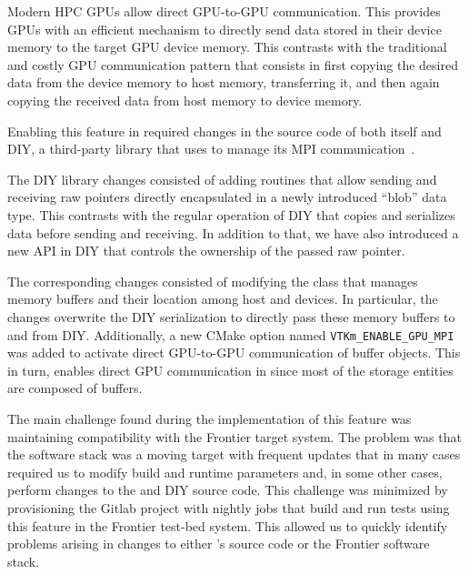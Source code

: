Modern HPC GPUs allow direct GPU-to-GPU communication. This provides GPUs with an efficient mechanism to directly send data stored in their device memory to the target GPU device memory. This contrasts with the traditional and costly GPU communication pattern that consists in first copying the desired data from the device memory to host memory, transferring it, and then again copying the received data from host memory to device memory.

Enabling this feature in \vtkm required changes in the source code of both \vtkm itself and DIY, a third-party library that \vtkm uses to manage its MPI communication~\cite{Peterka2011,Morozov2016}.

The DIY library changes consisted of adding routines that allow sending and receiving raw pointers directly encapsulated in a newly introduced ``blob'' data type. This contrasts with the regular operation of DIY that copies and serializes data before sending and receiving. In addition to that, we have also introduced a new API in DIY that controls the ownership of the passed raw pointer.

The corresponding \vtkm changes consisted of modifying the \vtkm class that manages memory buffers and their location among host and devices.
In particular, the changes overwrite the DIY serialization to directly pass these memory buffers to and from DIY.
Additionally, a new CMake option named \texttt{VTKm\_ENABLE\_GPU\_MPI} was added to activate direct GPU-to-GPU communication of \vtkm buffer objects.
This in turn, enables direct GPU communication in \vtkm since most of the \vtkm storage entities are composed of \vtkm buffers. 

The main challenge found during the implementation of this feature was maintaining compatibility with the Frontier target system.
The problem was that the software stack was a moving target with frequent updates that in many cases required us to modify build and runtime parameters and, in some other cases, perform changes to the \vtkm and DIY source code.
This challenge was minimized by provisioning the \vtkm Gitlab project with nightly jobs that build and run tests using this feature in the Frontier test-bed system.
This allowed us to quickly identify problems arising in changes to either \vtkm's source code or the Frontier software stack.
